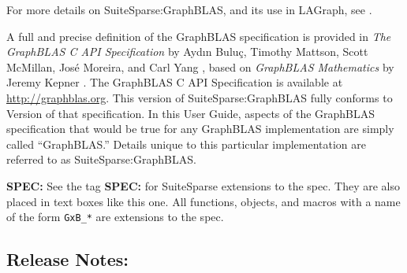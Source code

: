 \documentclass[12pt]{article}
\begin{document}

For more details on SuiteSparse:GraphBLAS, and its use in LAGraph, see
\cite{Davis18,Davis18b,DavisAznavehKolodziej19,Davis20,Mattson19}.

A full and precise
definition of the GraphBLAS specification is provided in {\em The GraphBLAS C
API Specification} by {Ayd\i n Bulu\c{c}, Timothy Mattson, Scott McMillan,
Jos\'e Moreira, and Carl Yang} \cite{BulucMattsonMcMillanMoreiraYang17,spec},
based on {\em GraphBLAS Mathematics} by Jeremy Kepner \cite{Kepner2017}.  The
GraphBLAS C API Specification is available at \url{http://graphblas.org}.  This
version of SuiteSparse:GraphBLAS fully conforms to Version
 of that specification.  In this User Guide,
aspects of the GraphBLAS specification that would be true for any GraphBLAS
implementation are simply called ``GraphBLAS.'' Details unique to this
particular implementation are referred to as SuiteSparse:GraphBLAS.

\begin{spec}
{\bf SPEC:} See the tag {\bf SPEC:} for SuiteSparse extensions to the spec.
They are also placed in text boxes like this one.  All functions, objects, and
macros with a name of the form \verb'GxB_*' are extensions to the spec.
\end{spec}

\newpage
\subsection{Release Notes:}
\end{document}
